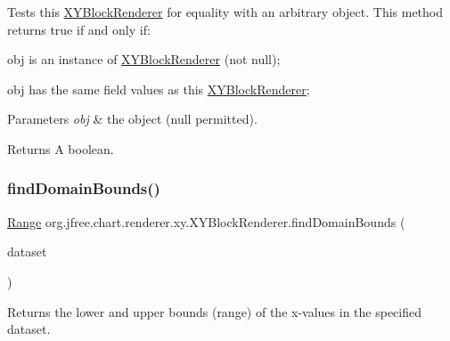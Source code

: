 Tests this {\ttfamily \mbox{\hyperlink{classorg_1_1jfree_1_1chart_1_1renderer_1_1xy_1_1_x_y_block_renderer}{X\+Y\+Block\+Renderer}}} for equality with an arbitrary object. This method returns {\ttfamily true} if and only if\+: 
\begin{DoxyItemize}
\item {\ttfamily obj} is an instance of {\ttfamily \mbox{\hyperlink{classorg_1_1jfree_1_1chart_1_1renderer_1_1xy_1_1_x_y_block_renderer}{X\+Y\+Block\+Renderer}}} (not {\ttfamily null}); 
\item {\ttfamily obj} has the same field values as this {\ttfamily \mbox{\hyperlink{classorg_1_1jfree_1_1chart_1_1renderer_1_1xy_1_1_x_y_block_renderer}{X\+Y\+Block\+Renderer}}}; 
\end{DoxyItemize}


\begin{DoxyParams}{Parameters}
{\em obj} & the object ({\ttfamily null} permitted).\\
\hline
\end{DoxyParams}
\begin{DoxyReturn}{Returns}
A boolean. 
\end{DoxyReturn}
\mbox{\label{classorg_1_1jfree_1_1chart_1_1renderer_1_1xy_1_1_x_y_block_renderer_a06dee596697cffdf1e23acb81a2ecd5e}} 
\subsubsection{\texorpdfstring{find\+Domain\+Bounds()}{findDomainBounds()}}
{\footnotesize\ttfamily \mbox{\hyperlink{classorg_1_1jfree_1_1data_1_1_range}{Range}} org.\+jfree.\+chart.\+renderer.\+xy.\+X\+Y\+Block\+Renderer.\+find\+Domain\+Bounds (\begin{DoxyParamCaption}\item[{\mbox{\hyperlink{interfaceorg_1_1jfree_1_1data_1_1xy_1_1_x_y_dataset}{X\+Y\+Dataset}}}]{dataset }\end{DoxyParamCaption})}

Returns the lower and upper bounds (range) of the x-\/values in the specified dataset.


